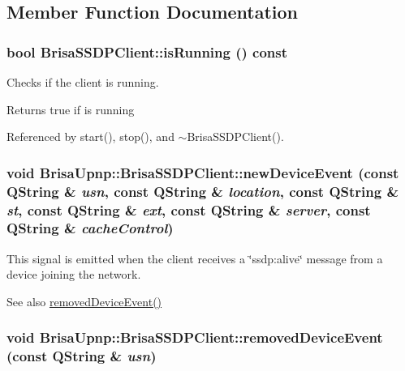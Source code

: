 \subsection{Member Function Documentation}
\hypertarget{classBrisaUpnp_1_1BrisaSSDPClient_ae2aebc6140ce5e88172f42c0c6958922}{
\subsubsection[{isRunning}]{\setlength{\rightskip}{0pt plus 5cm}bool BrisaSSDPClient::isRunning () const}}
\label{classBrisaUpnp_1_1BrisaSSDPClient_ae2aebc6140ce5e88172f42c0c6958922}


Checks if the client is running. \begin{DoxyReturn}{Returns}
true if is running 
\end{DoxyReturn}


Referenced by start(), stop(), and $\sim$BrisaSSDPClient().\hypertarget{classBrisaUpnp_1_1BrisaSSDPClient_adc61d6338504d3e47dc68712bbd77b23}{
\subsubsection[{newDeviceEvent}]{\setlength{\rightskip}{0pt plus 5cm}void BrisaUpnp::BrisaSSDPClient::newDeviceEvent (const QString \& {\em usn}, \/  const QString \& {\em location}, \/  const QString \& {\em st}, \/  const QString \& {\em ext}, \/  const QString \& {\em server}, \/  const QString \& {\em cacheControl})}}
\label{classBrisaUpnp_1_1BrisaSSDPClient_adc61d6338504d3e47dc68712bbd77b23}


This signal is emitted when the client receives a \char`\"{}ssdp:alive\char`\"{} message from a device joining the network. \begin{DoxySeeAlso}{See also}
\hyperlink{classBrisaUpnp_1_1BrisaSSDPClient_a332ac8038acc5271fb662239eca70599}{removedDeviceEvent()} 
\end{DoxySeeAlso}
\hypertarget{classBrisaUpnp_1_1BrisaSSDPClient_a332ac8038acc5271fb662239eca70599}{
\subsubsection[{removedDeviceEvent}]{\setlength{\rightskip}{0pt plus 5cm}void BrisaUpnp::BrisaSSDPClient::removedDeviceEvent (const QString \& {\em usn})}}
\label{classBrisaUpnp_1_1BrisaSSDPClient_a332ac8038acc5271fb662239eca70599}


